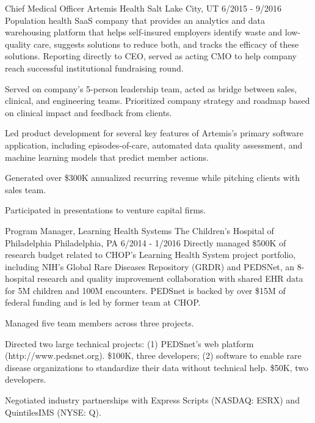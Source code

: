 \begin{cventries}
  \cvexperience
    {Chief Medical Officer}
    {Artemis Health}
    {Salt Lake City, UT}
    {6/2015 - 9/2016}
    {Population health SaaS company that provides an analytics and data warehousing platform that helps self-insured employers identify waste and low-quality care, suggests solutions to reduce both, and tracks the efficacy of these solutions. Reporting directly to CEO, served as acting CMO to help company reach successful institutional fundraising round.}
    {
      \begin{cvitems}
              \item {Served on company's 5-person leadership team, acted as bridge between  sales, clinical, and engineering teams. Prioritized company strategy and roadmap based on clinical impact and feedback from clients. }
               \item {Led product development for several key features of Artemis's primary software application, including  episodes-of-care, automated data quality assessment, and machine learning models that predict member actions.}
               \item {Generated over \$300K annualized recurring revenue while pitching clients with sales team.}
               \item {Participated in presentations to venture capital firms.}
             \end{cvitems}
    }
  \cvexperience
    {Program Manager, Learning Health Systems}
    {The Children's Hospital of Philadelphia}
    {Philadelphia, PA}
    {6/2014 - 1/2016}
    {Directly managed \$500K of research budget related to CHOP's Learning Health System project portfolio, including NIH's Global Rare Diseases Repository (GRDR) and PEDSNet, an 8-hospital research and quality improvement collaboration with shared EHR data for 5M children and 100M encounters. PEDSnet is backed by over \$15M of federal funding and is led by former team at CHOP.}
    {
      \begin{cvitems}
              \item {Managed five team members across three projects.}
               \item {Directed two large technical projects: (1) PEDSnet's web platform (http://www.pedsnet.org). \$100K, three developers; (2) software to enable rare disease organizations to standardize their data without technical help. \$50K, two developers.}
               \item {Negotiated industry partnerships with Express Scripts (NASDAQ: ESRX) and QuintilesIMS (NYSE: Q).}

\end{cvitems}}
\end{cventries}

